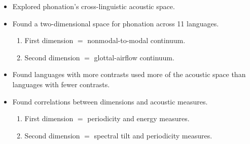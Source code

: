 \documentclass[professionalfonts]{beamer}
\begin{document}
\begin{frame}{\citet{keatingCrosslanguageAcousticSpace2023}}
  \begin{itemize}
    \item Explored phonation's cross-linguistic acoustic space.
    \item Found a two-dimensional space for phonation across 11 languages.
    \begin{enumerate}
      \item First dimension $=$ nonmodal-to-modal continuum.
      \item Second dimension $=$ glottal-airflow continuum.
    \end{enumerate}
    \item Found languages with more contrasts used more of the acoustic space than languages with fewer contrasts.
    \item Found correlations between dimensions and acoustic measures.
    \begin{enumerate}
      \item First dimension $=$ periodicity and energy measures.
      \item Second dimension $=$ spectral tilt and periodicity measures.
    \end{enumerate}
  \end{itemize}
\end{frame}
\end{document}
